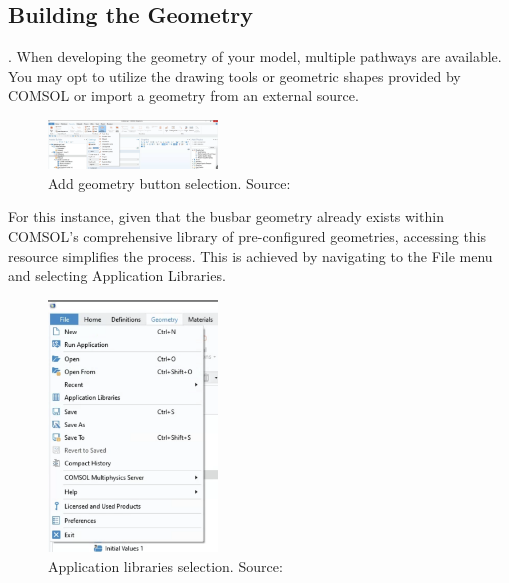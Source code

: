 \subsection{Building the Geometry}.
When developing the geometry of your model, multiple pathways are available. You may opt to utilize the drawing tools or geometric shapes provided by COMSOL or import a geometry from an external source.

\begin{figure}[ht!]
  \centering
  \includegraphics[width=0.4\textwidth]{Chapters/Figures/Chapter 3 Figures/Geometry Tab.png}
  \caption{Add geometry button selection. Source: \cite{multiphysics__modeling_nodate}}
  \label{fig:Add geometry button selection.}
\end{figure}

For this instance, given that the busbar geometry already exists within COMSOL's comprehensive library of pre-configured geometries, accessing this resource simplifies the process. This is achieved by navigating to the File menu and selecting Application Libraries.

\begin{figure}[ht!]
  \centering
  \includegraphics[width=0.4\textwidth]{Chapters/Figures/Chapter 3 Figures/Application Libraries Button.png}
  \caption{Application libraries selection. Source: \cite{multiphysics__modeling_nodate}}
  \label{fig:"application libraries" selection}
\end{figure}

